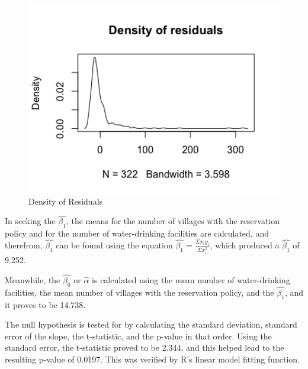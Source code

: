 \documentclass[12pt,letterpaper]{article}
\begin{document}
\begin{enumerate}
	\begin{figure}[h!]
		\caption{\footnotesize{Density of Residuals}}
		\vspace{.5cm}
		\centering
		\label{fig:density_resid2}
		\includegraphics[width=1\textwidth]{./PS2_Graph_1.png}
	\end{figure}	

	In seeking the $\hat{\beta_1} $, the means for the number of villages with the reservation policy and for the number of water-drinking facilities are calculated, and therefrom, $\hat{\beta_1} $ can be found using the equation $\hat{\beta_1} = \frac{\Sigma x_i y_i}{\Sigma x_i^2} $, which produced a $\hat{\beta_1} $ of 9.252.
	 
	\vspace{.5cm}	
	
	Meanwhile, the $\hat{\beta_0} $ or $\hat{\alpha} $ is calculated using the mean number of water-drinking facilities, the mean number of villages with the reservation policy, and the $\hat{\beta_1} $, and it proves to be 14.738.
	
	 
	\vspace{.5cm}
	
	The null hypothesis is tested for by calculating the standard deviation, standard error of the slope, the t-statistic, and the p-value in that order. Using the standard error, the t-statistic proved to be 2.344, and this helped lead to the resulting p-value of 0.0197. This was verified by R's linear model fitting function.
	
	 	
	\vspace{.5cm}
	

\end{enumerate}
\end{document}
